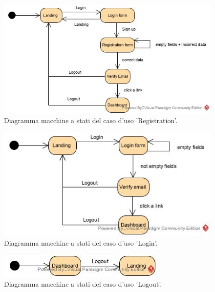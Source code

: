 
\begin{figure}[H]
	\centering
	\caption{Diagramma macchine a stati del caso d'uso 'Registration'.}
	\label{fig:diagramma-macchine-stati:registration}
	\includegraphics[width=\textwidth]{images/diagramma-macchine-stati/registration}
\end{figure}

\begin{figure}[H]
	\centering
	\caption{Diagramma macchine a stati del caso d'uso 'Login'.}
	\label{fig:diagramma-macchine-stati:login}
	\includegraphics[width=\textwidth]{images/diagramma-macchine-stati/login}
\end{figure}
\begin{figure}[H]
	\centering

	\caption{Diagramma macchine a stati del caso d'uso 'Logout'.}
	\label{fig:diagramma-macchine-stati:logout}
	\includegraphics[width=\textwidth]{images/diagramma-macchine-stati/logout}
\end{figure}

